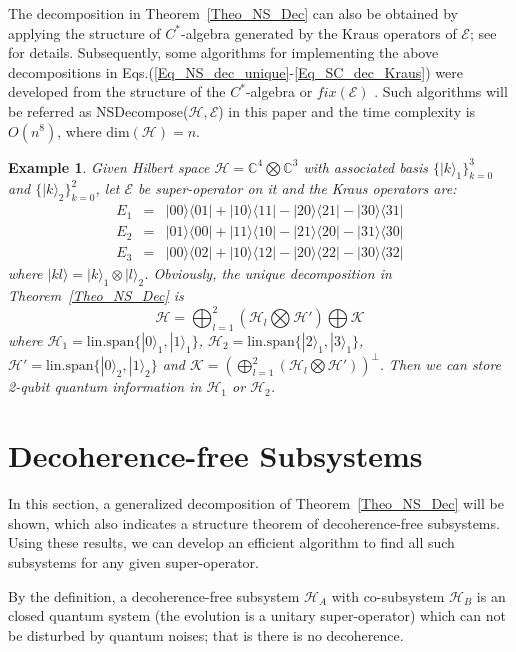 \documentclass[journal]{IEEEtran}
\def\h{\ensuremath{\mathcal{H}}}
\def\k{\ensuremath{\mathcal{K}}}
\def\e{\ensuremath{\mathcal{E}}}
\def\k{\mathcal{K}}
\newtheorem{example}{Example}
\begin{document}
The decomposition in Theorem~\ref{Theo_NS_Dec} can also be obtained by applying the structure of  $C^*$-algebra generated by the Kraus operators of $\e$; see \cite{choi2006method} for details. Subsequently, some algorithms for implementing the above decompositions in Eqs.(\ref{Eq_NS_dec_unique}-\ref{Eq_SC_dec_Kraus}) were developed from the structure of the $C^*$-algebra   or $fix(\e)$   \cite{guan2016decomposition,knill2006protected,wang2013numerical}.  Such algorithms will be referred as NSDecompose($\h,\e$) in this paper and the time complexity is $O(n^{8})$, where dim$(\h)=n$. 

\begin{example}
  Given Hilbert space $\h=\mathbb{C}^4\bigotimes \mathbb{C}^3$ with associated basis $\{|k\rangle_1\}_{k=0}^3$ and $\{|k\rangle_2\}_{k=0}^2$, let $\e$ be super-operator on it and the Kraus operators are:
  \begin{eqnarray*}
    E_{1}&=&|00\rangle\langle01|+|10\rangle\langle11|-|20\rangle\langle21|-|30\rangle\langle31|\\
    E_{2}&=&|01\rangle\langle00|+|11\rangle\langle10|-|21\rangle\langle20|-|31\rangle\langle30|\\
    E_{3}&=&|00\rangle\langle02|+|10\rangle\langle12|-|20\rangle\langle22|-|30\rangle\langle32|
  \end{eqnarray*}
  where $|kl\rangle=|k\rangle_1\otimes |l\rangle_2$. Obviously, the unique decomposition in Theorem~\ref{Theo_NS_Dec} is $$\h=\bigoplus_{l=1}^2(\h_l\bigotimes \h') \bigoplus\k$$
  where $\h_1=\textrm{lin.span}\{|0\rangle_1,|1\rangle_1\}$, $\h_2=\textrm{lin.span}\{|2\rangle_1,|3\rangle_1\}$, $\h'=\textrm{lin.span}\{|0\rangle_2,|1\rangle_2\}$ and $\k=(\bigoplus_{l=1}^2(\h_l\bigotimes \h'))^{\perp}.$ Then we can store 2-qubit quantum information in $\h_1$ or $\h_2$.
\end{example}

\section{Decoherence-free Subsystems}
In this section, a generalized decomposition of Theorem~\ref{Theo_NS_Dec} will be shown, which also indicates a structure theorem of decoherence-free subsystems. Using these results, we can develop an efficient algorithm to find all such subsystems for any given super-operator. 


By the definition, a decoherence-free subsystem $\h_A$ with co-subsystem $\h_B$  is an closed quantum system (the evolution is a unitary super-operator) which can not be disturbed by quantum noises; that is there is no decoherence. 
 
\end{document}
